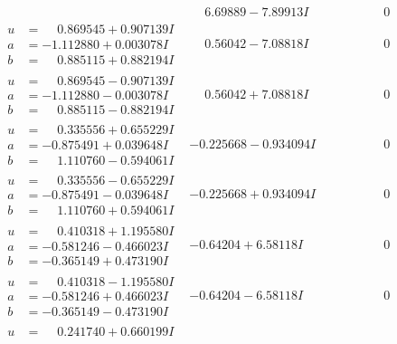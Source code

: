\documentclass[1p]{elsarticle_modified}
\theoremstyle{definition}
\begin{document}
$$\begin{array}{c|c|c}
 & \phantom{-}6.69889 - 7.89913 I & \phantom{-0.000000 } 0 \\ \hline\begin{aligned}
u &= \phantom{-}0.869545 + 0.907139 I \\
a &= -1.112880 + 0.003078 I \\
b &= \phantom{-}0.885115 + 0.882194 I\end{aligned}
 & \phantom{-}0.56042 - 7.08818 I & \phantom{-0.000000 } 0 \\ \hline\begin{aligned}
u &= \phantom{-}0.869545 - 0.907139 I \\
a &= -1.112880 - 0.003078 I \\
b &= \phantom{-}0.885115 - 0.882194 I\end{aligned}
 & \phantom{-}0.56042 + 7.08818 I & \phantom{-0.000000 } 0 \\ \hline\begin{aligned}
u &= \phantom{-}0.335556 + 0.655229 I \\
a &= -0.875491 + 0.039648 I \\
b &= \phantom{-}1.110760 - 0.594061 I\end{aligned}
 & -0.225668 - 0.934094 I & \phantom{-0.000000 } 0 \\ \hline\begin{aligned}
u &= \phantom{-}0.335556 - 0.655229 I \\
a &= -0.875491 - 0.039648 I \\
b &= \phantom{-}1.110760 + 0.594061 I\end{aligned}
 & -0.225668 + 0.934094 I & \phantom{-0.000000 } 0 \\ \hline\begin{aligned}
u &= \phantom{-}0.410318 + 1.195580 I \\
a &= -0.581246 - 0.466023 I \\
b &= -0.365149 + 0.473190 I\end{aligned}
 & -0.64204 + 6.58118 I & \phantom{-0.000000 } 0 \\ \hline\begin{aligned}
u &= \phantom{-}0.410318 - 1.195580 I \\
a &= -0.581246 + 0.466023 I \\
b &= -0.365149 - 0.473190 I\end{aligned}
 & -0.64204 - 6.58118 I & \phantom{-0.000000 } 0 \\ \hline\begin{aligned}
u &= \phantom{-}0.241740 + 0.660199 I \\

\end{aligned}
\end{array}$$
\end{document}
